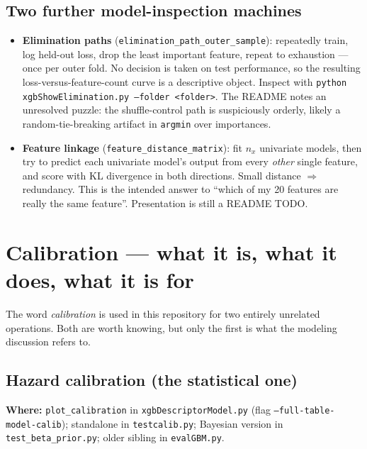 \documentclass[11pt,a4paper]{article}
\newcommand{\code}[1]{\texttt{\small #1}}
\begin{document}
\subsection{Two further model-inspection machines}

\begin{itemize}[leftmargin=2em]
\item \textbf{Elimination paths} (\code{elimination\_path\_outer\_sample}): repeatedly train, log
held-out loss, drop the least important feature, repeat to exhaustion --- once per outer fold. No
decision is taken on test performance, so the resulting loss-versus-feature-count curve is a
descriptive object. Inspect with \code{python xgbShowElimination.py --folder <folder>}. The README
notes an unresolved puzzle: the shuffle-control path is suspiciously orderly, likely a
random-tie-breaking artifact in \code{argmin} over importances.
\item \textbf{Feature linkage} (\code{feature\_distance\_matrix}): fit $n_x$ univariate models, then
try to predict each univariate model's output from every \emph{other} single feature, and score with
KL divergence in both directions. Small distance $\Rightarrow$ redundancy. This is the intended
answer to ``which of my 20 features are really the same feature''. Presentation is still a README
TODO.
\end{itemize}

\section{Calibration --- what it is, what it does, what it is for}
\label{sec:calib}

The word \emph{calibration} is used in this repository for two entirely unrelated operations. Both
are worth knowing, but only the first is what the modeling discussion refers to.

\subsection{Hazard calibration (the statistical one)}

\textbf{Where:} \code{plot\_calibration} in \code{xgbDescriptorModel.py} (flag
\code{--full-table-model-calib}); standalone in \code{testcalib.py}; Bayesian version in
\code{test\_beta\_prior.py}; older sibling in \code{evalGBM.py}.
\end{document}

